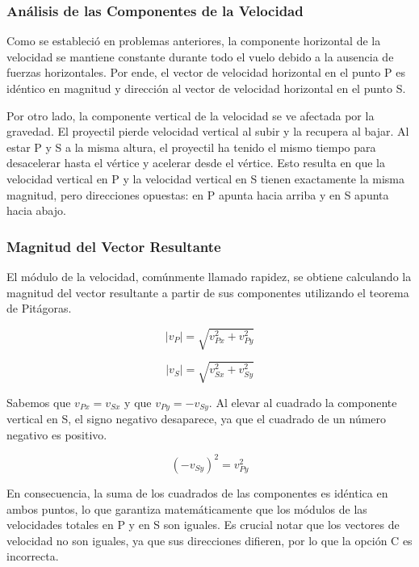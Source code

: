 \documentclass[12pt, a4paper]{article}
\begin{document}
\subsubsection*{Análisis de las Componentes de la Velocidad}

Como se estableció en problemas anteriores, la componente horizontal de la velocidad se mantiene constante durante todo el vuelo debido a la ausencia de fuerzas horizontales. Por ende, el vector de velocidad horizontal en el punto P es idéntico en magnitud y dirección al vector de velocidad horizontal en el punto S.

Por otro lado, la componente vertical de la velocidad se ve afectada por la gravedad. El proyectil pierde velocidad vertical al subir y la recupera al bajar. Al estar P y S a la misma altura, el proyectil ha tenido el mismo tiempo para desacelerar hasta el vértice y acelerar desde el vértice. Esto resulta en que la velocidad vertical en P y la velocidad vertical en S tienen exactamente la misma magnitud, pero direcciones opuestas: en P apunta hacia arriba y en S apunta hacia abajo.

\subsubsection*{Magnitud del Vector Resultante}

El módulo de la velocidad, comúnmente llamado rapidez, se obtiene calculando la magnitud del vector resultante a partir de sus componentes utilizando el teorema de Pitágoras.

\begin{equation}
|v_P| = \sqrt{v_{Px}^2 + v_{Py}^2}
\end{equation}

\begin{equation}
|v_S| = \sqrt{v_{Sx}^2 + v_{Sy}^2}
\end{equation}

Sabemos que $v_{Px} = v_{Sx}$ y que $v_{Py} = -v_{Sy}$. Al elevar al cuadrado la componente vertical en S, el signo negativo desaparece, ya que el cuadrado de un número negativo es positivo.

\begin{equation}
(-v_{Sy})^2 = v_{Py}^2
\end{equation}

En consecuencia, la suma de los cuadrados de las componentes es idéntica en ambos puntos, lo que garantiza matemáticamente que los módulos de las velocidades totales en P y en S son iguales. Es crucial notar que los vectores de velocidad no son iguales, ya que sus direcciones difieren, por lo que la opción C es incorrecta.
\end{document}
